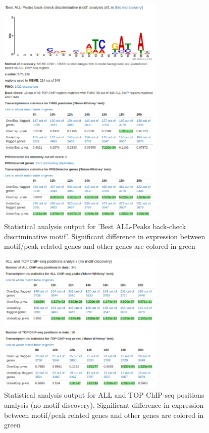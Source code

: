 \documentclass{bioinfo}
\begin{document}
\begin{methods}
\begin{figure}[!tpb]%
\centerline{\includegraphics[width=8cm]{stats_motif.png}}
\caption{Statistical analysis output for 'Best ALL-Peaks back-check discriminative motif'. Significant difference in expression between motif/peak related genes and other genes are colored in green}\label{fig:01}
\end{figure}

\begin{figure}[!tpb]%
\centerline{\includegraphics[width=8cm]{chip_seq_stats.png}}
\caption{Statistical analysis output for ALL and TOP ChIP-seq positions analysis (no motif discovery). Significant difference in expression between motif/peak related genes and other genes are colored in green}\label{fig:02}
\end{figure}



\end{methods}
\end{document}
